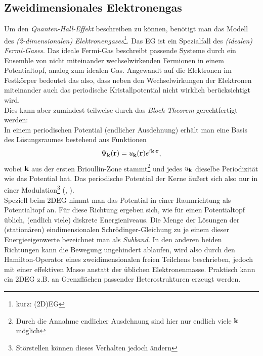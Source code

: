 \subsection{Zweidimensionales Elektronengas}
Um den \emph{Quanten-Hall-Effekt} beschreiben zu können, benötigt man das Modell des \emph{(2-dimensionalen) Elektronengases}\footnote{kurz: (2D)EG}.
Das EG ist ein Spezialfall des \emph{(idealen) Fermi-Gases}. Das ideale Fermi-Gas beschreibt passende Systeme durch ein Ensemble von nicht miteinander wechselwirkenden Fermionen in einem Potentialtopf, analog zum idealen Gas.
Angewandt auf die Elektronen im Festkörper bedeutet das also, dass neben den Wechselwirkungen der Elektronen miteinander auch das periodische Kristallpotential nicht wirklich berücksichtigt wird.\\

Dies kann aber zumindest teilweise durch das \emph{Bloch-Theorem} gerechtfertigt werden:\\
In einem periodischen Potential (endlicher Ausdehnung) erhält man eine Basis des Lösungsraumes bestehend aus Funktionen
$$\Psi_{\textbf{k}}(\textbf{r}) = u_{\textbf{k}}(\textbf{r}) e^{i\textbf{k}\cdot\textbf{r}},$$
wobei $\textbf{k}$ aus der ersten Brioullin-Zone stammt\footnote{Durch die Annahme endlicher Ausdehnung sind hier nur endlich viele $\textbf{k}$ möglich} und jedes $u_{\textbf{k}}$ dieselbe Periodizität wie das Potential hat.
Das periodische Potential der Kerne äußert sich also nur in einer Modulation\footnote{Störstellen können dieses Verhalten jedoch ändern} (\cite{czy15}, \cite{gro18}).\\

Speziell beim 2DEG nimmt man das Potential in einer Raumrichtung als Potentialtopf an. Für diese Richtung ergeben sich, wie für einen Potentialtopf üblich, (endlich viele) diskrete Energieniveaus. Die Menge der Lösungen der (stationären) eindimensionalen Schrödinger-Gleichung zu je einem dieser Energieeigenwerte bezeichnet man als \emph{Subband}.
In den anderen beiden Richtungen kann die Bewegung ungehindert ablaufen, wird also durch den Hamilton-Operator eines zweidimensionalen freien Teilchens beschrieben, jedoch mit einer effektiven Masse anstatt der üblichen Elektronenmasse.
Praktisch kann ein 2DEG z.B. an Grenzflächen passender Heterostrukturen erzeugt werden.

